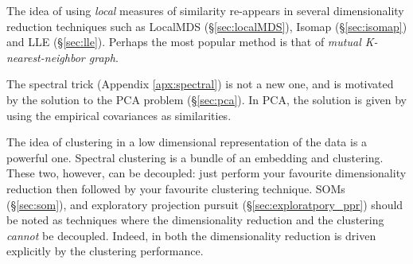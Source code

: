 The idea of using \emph{local} measures of similarity re-appears in several dimensionality reduction techniques such as LocalMDS (\S\ref{sec:localMDS}), Isomap (\S\ref{sec:isomap}) and LLE (\S\ref{sec:lle}).
Perhaps the most popular method is that of \emph{mutual K-nearest-neighbor graph}.

The spectral trick (Appendix \ref{apx:spectral}) is not a new one, and is motivated by the solution to the PCA problem (\S\ref{sec:pca}). In PCA, the solution is given by using the empirical covariances as similarities. 

The idea of clustering in a low dimensional representation of the data is a powerful one. 
Spectral clustering is a bundle of an embedding and clustering. 
These two, however, can be decoupled: just perform your favourite dimensionality reduction then followed by your favourite clustering technique.
SOMs (\S\ref{sec:som}), and exploratory projection pursuit (\S\ref{sec:exploratpory_ppr}) should be noted as techniques where the dimensionality reduction and the clustering \emph{cannot} be decoupled. Indeed, in both the dimensionality reduction is driven explicitly by the clustering performance.  



